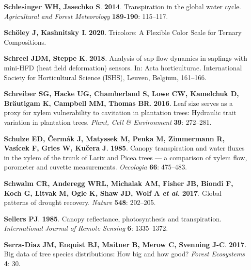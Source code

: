 \documentclass[11pt,twoside]{reedthesis}
\begin{document}
\hypertarget{ref-Schlesinger2014}{}
\textbf{\textnormal{Schlesinger WH}, \textnormal{Jasechko S}}.
\textbf{2014}. Transpiration in the global water cycle.
\emph{Agricultural and Forest Meteorology} \textbf{189-190}: 115--117.

\hypertarget{ref-scholey_tricolore_2020}{}
\textbf{\textnormal{Schöley J}, \textnormal{Kashnitsky I}}.
\textbf{2020}. Tricolore: A Flexible Color Scale for Ternary
Compositions.

\hypertarget{ref-Schreel2018}{}
\textbf{\textnormal{Schreel JDM}, \textnormal{Steppe K}}. \textbf{2018}.
Analysis of sap flow dynamics in saplings with mini-HFD (heat field
deformation) sensors. In: Acta horticulturae. International Society for
Horticultural Science (ISHS), Leuven, Belgium, 161--166.

\hypertarget{ref-schreiber_leaf_2016}{}
\textbf{\textnormal{Schreiber SG}, \textnormal{Hacke UG},
\textnormal{Chamberland S}, \textnormal{Lowe CW}, \textnormal{Kamelchuk
D}, \textnormal{Bräutigam K}, \textnormal{Campbell MM},
\textnormal{Thomas BR}}. \textbf{2016}. Leaf size serves as a proxy for
xylem vulnerability to cavitation in plantation trees: Hydraulic trait
variation in plantation trees. \emph{Plant, Cell \& Environment}
\textbf{39}: 272--281.

\hypertarget{ref-schulze_canopy_1985}{}
\textbf{\textnormal{Schulze ED}, \textnormal{Čermák J},
\textnormal{Matyssek M}, \textnormal{Penka M}, \textnormal{Zimmermann
R}, \textnormal{Vasícek F}, \textnormal{Gries W}, \textnormal{Kučera
J}}. \textbf{1985}. Canopy transpiration and water fluxes in the xylem
of the trunk of Larix and Picea trees --- a comparison of xylem flow,
porometer and cuvette measurements. \emph{Oecologia} \textbf{66}:
475--483.

\hypertarget{ref-Schwalm2017}{}
\textbf{\textnormal{Schwalm CR}, \textnormal{Anderegg WRL},
\textnormal{Michalak AM}, \textnormal{Fisher JB}, \textnormal{Biondi F},
\textnormal{Koch G}, \textnormal{Litvak M}, \textnormal{Ogle K},
\textnormal{Shaw JD}, \textnormal{Wolf A} \emph{et al.}} \textbf{2017}.
Global patterns of drought recovery. \emph{Nature} \textbf{548}:
202--205.

\hypertarget{ref-Sellers1985}{}
\textbf{\textnormal{Sellers PJ}}. \textbf{1985}. Canopy reflectance,
photosynthesis and transpiration. \emph{International Journal of Remote
Sensing} \textbf{6}: 1335--1372.

\hypertarget{ref-serra-diaz_big_2017}{}
\textbf{\textnormal{Serra-Diaz JM}, \textnormal{Enquist BJ},
\textnormal{Maitner B}, \textnormal{Merow C}, \textnormal{Svenning
J-C}}. \textbf{2017}. Big data of tree species distributions: How big
and how good? \emph{Forest Ecosystems} \textbf{4}: 30.
\end{document}
